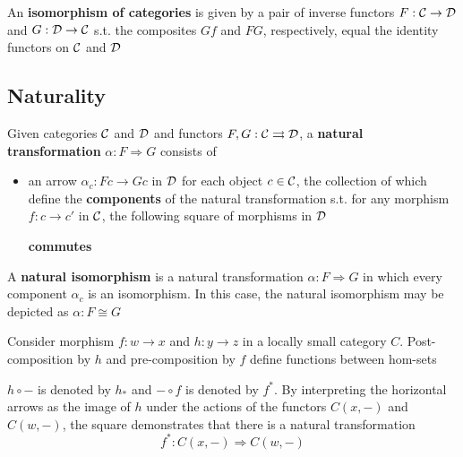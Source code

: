 \documentclass[11pt]{article}
\begin{document}
An \textbf{isomorphism of categories} is given by a pair of inverse functors \(F:\mathcal{C}\to\mathcal{D}\) and \(G:\mathcal{D}\to\mathcal{C}\) s.t.
the composites \(Gf\) and \(FG\), respectively, equal the identity functors on \(\mathcal{C}\) and \(\mathcal{D}\)
\subsection{Naturality}
\label{sec:orgb315c46}
\begin{definition}[]
Given categories \(\mathcal{C}\) and \(\mathcal{D}\) and functors \(F,G:\mathcal{C}\rightrightarrows\mathcal{D}\), a \textbf{natural
transformation} \(\alpha:F\Rightarrow G\) consists of
\begin{itemize}
\item an arrow \(\alpha_c:Fc\to Gc\) in \(\mathcal{D}\) for each object \(c\in\mathcal{C}\), the collection of which define the
\textbf{components} of the natural transformation s.t. for any morphism \(f:c\to c'\) in \(\mathcal{C}\), the
following square of morphisms in \(\mathcal{D}\)
\begin{center}\end{center}
\textbf{commutes}
\end{itemize}


A \textbf{natural isomorphism} is a natural transformation \(\alpha:F\Rightarrow G\) in which every component \(\alpha_c\) is
an isomorphism. In this case, the natural isomorphism may be depicted as \(\alpha:F\cong G\)

\begin{center}\end{center}
\end{definition}

\begin{examplle}[]
Consider morphism \(f:w\to x\) and \(h:y\to z\) in a locally small category \(C\). Post-composition
by \(h\) and pre-composition by \(f\) define functions between hom-sets
\begin{center}\end{center}
\(h\circ -\) is denoted by \(h_*\) and \(-\circ f\) is denoted by \(f^*\). By interpreting the
horizontal arrows as the image of \(h\) under the actions of the functors \(C(x,-)\)
and \(C(w,-)\), the square demonstrates that there is a natural transformation
\begin{equation*}
f^*:C(x,-)\Rightarrow C(w,-)
\end{equation*}
\end{examplle}
\end{document}
